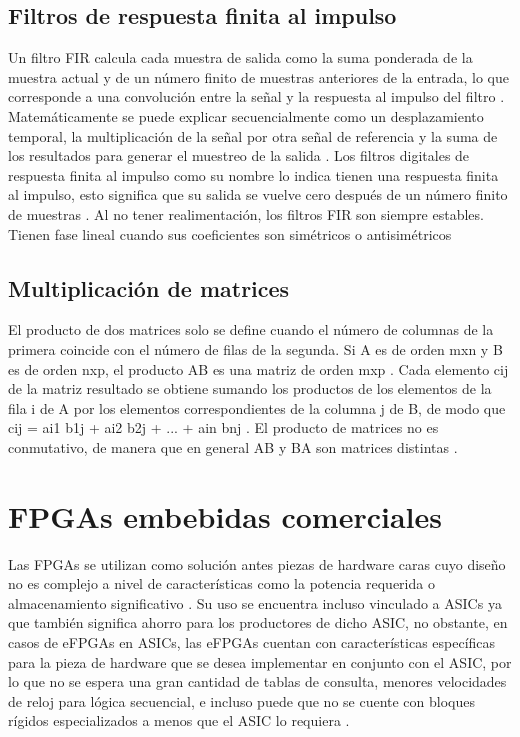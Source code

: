 \subsection{Filtros de respuesta finita al impulso}
Un filtro FIR calcula cada muestra de salida como la suma ponderada de la muestra actual y de un número finito de muestras anteriores de la entrada, lo que corresponde a una convolución entre la señal y la respuesta al impulso del filtro \cite{proakis1996digital}. Matemáticamente se puede explicar secuencialmente como un desplazamiento temporal, la multiplicación de la señal por otra señal de referencia y la suma de los resultados para generar el muestreo de la salida \cite{meyerbaese2014digital, proakis1996digital}. Los filtros digitales de respuesta finita al impulso como su nombre lo indica tienen una respuesta finita al impulso, esto significa que su salida se vuelve cero después de un número finito de muestras \cite{meyerbaese2014digital, proakis1996digital}. Al no tener realimentación, los filtros FIR son siempre estables. Tienen fase lineal cuando sus coeficientes son simétricos o antisimétricos \cite{proakis1996digital} 

\subsection{Multiplicación de matrices}
El producto de dos matrices solo se define cuando el número de columnas de la primera coincide con el número de filas de la segunda. Si A es de orden mxn y B es de orden nxp, el producto AB es una matriz de orden mxp \cite{O_mayhua2018}. Cada elemento cij de la matriz resultado se obtiene sumando los productos de los elementos de la fila i de A por los elementos correspondientes de la columna j de B, de modo que cij = ai1 b1j + ai2 b2j + ... + ain bnj \cite{O_mayhua2018}. El producto de matrices no es conmutativo, de manera que en general AB y BA son matrices distintas \cite{O_mayhua2018}.

\section{FPGAs embebidas comerciales}
Las FPGAs se utilizan como solución antes piezas de hardware caras cuyo diseño no es complejo a nivel de características como la potencia requerida o almacenamiento significativo \cite{saidi2020survey}. Su uso se encuentra incluso vinculado a ASICs ya que también significa ahorro para los productores de dicho ASIC, no obstante, en casos de eFPGAs en ASICs, las eFPGAs cuentan con características específicas para la pieza de hardware que se desea implementar en conjunto con el ASIC, por lo que no se espera una gran cantidad de tablas de consulta, menores velocidades de reloj para lógica secuencial, e incluso puede que no se cuente con bloques rígidos especializados a menos que el ASIC lo requiera \cite{saidi2020survey}. 

